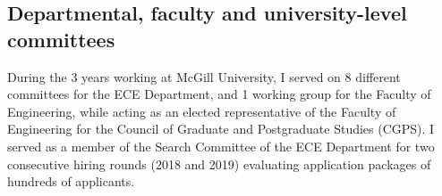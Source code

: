 \subsection{Departmental, faculty and university-level committees}
During the 3 years working at McGill University, I served on 8 different committees for the ECE Department, and 1 working group for the Faculty of Engineering, while acting as an elected representative of the Faculty of Engineering for the Council of Graduate and Postgraduate Studies (CGPS). I served as a member of the Search Committee of the ECE Department for two consecutive hiring rounds (2018 and 2019) evaluating application packages of hundreds of applicants. 


